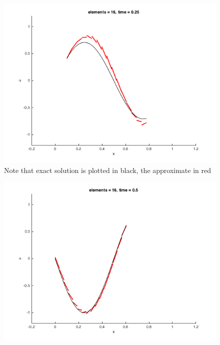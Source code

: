 \documentclass[11pt, oneside]{article}   	%
\begin{document}
\begin{figure}[h]
  \centering
  \includegraphics[width=\linewidth]{n16_t025.png}
\caption{Note that exact solution is plotted in black, the approximate in red}
\end{figure}

\begin{figure}[h]
  \centering
  \includegraphics[width=\linewidth]{n16_t050.png}
\end{figure}
\end{document}
